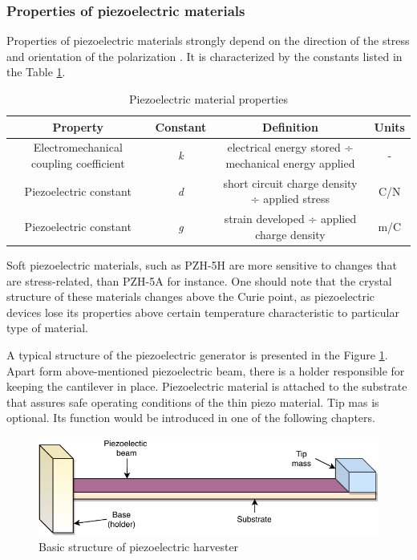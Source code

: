 \documentclass[12pt,a4paper]{article}
\begin{document}
\subsubsection{Properties of piezoelectric materials}
Properties of piezoelectric materials strongly depend on the direction of the stress and orientation of the polarization \cite{EnHv1}. It is characterized by the constants listed in the Table \ref{tab:material}. 

\begin{table}[ht!]
\begin{adjustbox}{width=\textwidth}
\begin{tabular}{|c|c|c|c|}
\hline
\textbf{Property} & \textbf{Constant} & \textbf{Definition} & \textbf{Units}\\ \hline
Electromechanical coupling coefficient & \textit{k} & electrical energy stored ÷ mechanical energy applied & -\\ \hline
Piezoelectric constant & \textit{d} & short circuit charge density ÷ applied stress & C/N\\ \hline
Piezoelectric constant & \textit{g} & strain developed ÷ applied charge density & m/C\\ \hline

\end{tabular}
\end{adjustbox}
\caption{Piezoelectric material properties \cite{EnHv1}}
\label{tab:material}
\end{table}

Soft piezoelectric materials, such as PZH-5H are more sensitive to changes that are stress-related, than PZH-5A for instance. One should note that the crystal structure of these materials changes above the Curie point, as piezoelectric devices lose its properties above certain temperature characteristic to particular type of material.
\par

A typical structure of the piezoelectric generator is presented in the Figure \ref{fig:basic}. Apart form above-mentioned piezoelectric beam, there is a holder responsible for keeping the cantilever in place. Piezoelectric material is attached to the substrate that assures safe operating conditions of the thin piezo material. Tip mas is optional. Its function would be introduced in one of the following chapters.

\begin{figure}[ht!]
\includegraphics[scale=1]{beam1.pdf}
\caption{Basic structure of piezoelectric harvester}
\label{fig:basic}
\end{figure}
\end{document}

